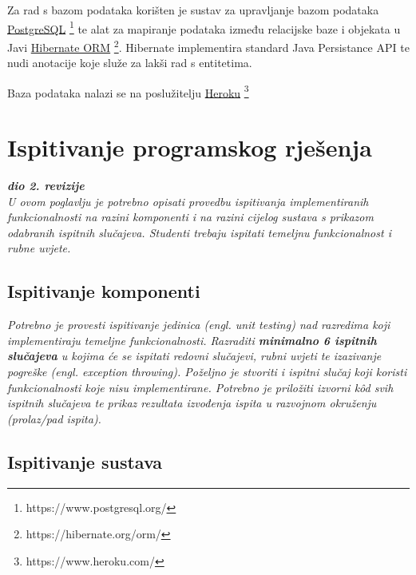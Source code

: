 			 Za rad s bazom podataka korišten je sustav za upravljanje bazom podataka \underline{PostgreSQL} \footnote{https://www.postgresql.org/} te alat za mapiranje podataka između relacijske baze i objekata u Javi \underline{Hibernate ORM} \footnote{https://hibernate.org/orm/}. Hibernate implementira standard Java Persistance API te nudi anotacije koje služe za lakši rad s entitetima.
			 
			 Baza podataka nalazi se na poslužitelju \underline{Heroku} \footnote{https://www.heroku.com/}
			
			
			\eject 
		
	
		\section{Ispitivanje programskog rješenja}
			
			\textbf{\textit{dio 2. revizije}}\\
			
			 \textit{U ovom poglavlju je potrebno opisati provedbu ispitivanja implementiranih funkcionalnosti na razini komponenti i na razini cijelog sustava s prikazom odabranih ispitnih slučajeva. Studenti trebaju ispitati temeljnu funkcionalnost i rubne uvjete.}
	
			
			\subsection{Ispitivanje komponenti}
			\textit{Potrebno je provesti ispitivanje jedinica (engl. unit testing) nad razredima koji implementiraju temeljne funkcionalnosti. Razraditi \textbf{minimalno 6 ispitnih slučajeva} u kojima će se ispitati redovni slučajevi, rubni uvjeti te izazivanje pogreške (engl. exception throwing). Poželjno je stvoriti i ispitni slučaj koji koristi funkcionalnosti koje nisu implementirane. Potrebno je priložiti izvorni kôd svih ispitnih slučajeva te prikaz rezultata izvođenja ispita u razvojnom okruženju (prolaz/pad ispita). }
			
			
			
			\subsection{Ispitivanje sustava}
			
